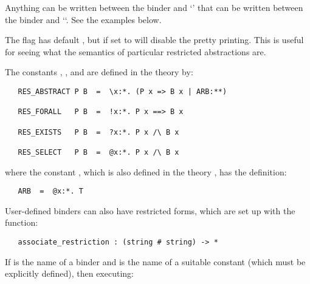 Anything can be written between the binder and `\ml{::}' that can be
written between the binder and ``. See the examples below.

The flag  has default , but if set to 
will disable the pretty printing. This is useful for seeing what the semantics
of particular restricted abstractions are.

The constants , ,  and 
 are
defined in the theory  by:


\begin{hol}
\begin{verbatim}
   RES_ABSTRACT P B  =  \x:*. (P x => B x | ARB:**)

   RES_FORALL   P B  =  !x:*. P x ==> B x

   RES_EXISTS   P B  =  ?x:*. P x /\ B x

   RES_SELECT   P B  =  @x:*. P x /\ B x
\end{verbatim}\end{hol}

\noindent where the constant ,
which is also defined in the theory , has the definition:

\begin{hol}\begin{verbatim}
   ARB  =  @x:*. T
\end{verbatim}\end{hol}

User-defined binders can also have restricted forms, which are set up
with the function:

\begin{boxed}
\begin{verbatim}
   associate_restriction : (string # string) -> *
\end{verbatim}\end{boxed}


\noindent If  is the name
of a binder and  is the name of a suitable constant (which
must be explicitly defined), then executing:

\begin{hol}
{\small\verb%   associate_restriction(`%}$c${\small\verb%`, `RES_%}$c${\small\verb%`)%}
\end{hol}

